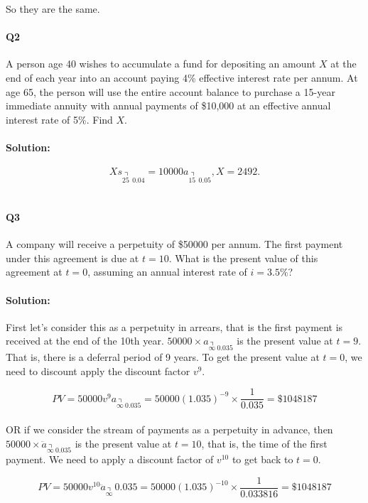 \documentclass[a4paper, 11pt, twoside]{article}
\begin{document}
So they are the same.\\

\paragraph{Q2} A person age 40 wishes to accumulate a fund for depositing an amount $X$ at the end of each year into an account paying 4\% effective interest rate per annum. At age 65, the person will use the entire account balance to purchase a 15-year immediate annuity with annual payments of \$10,000 at an effective annual interest rate of 5\%. Find $X$.\\

\paragraph{Solution:}

\[Xs_{\annuity{25\ \ }0.04} = 10000a_{\annuity{15\ \ }0.05}, X = 2492.\]\\

\paragraph{Q3} A company will receive a perpetuity of \$50000 per annum. The first payment under this agreement is due at $t=10$. What is the present value of this agreement at $t=0$, assuming an annual interest rate of $i=3.5\%$?\\

\paragraph{Solution:} First let's consider this as a perpetuity in arrears, that is the first payment is received at the end of the 10th year. $50000\times a_{\annuity{\infty\ }0.035}$ is the present value at $t=9$. That is, there is a deferral period of 9 years. To get the present value at $t=0$, we need to discount apply the discount factor $v^9$.

\[PV = 50000v^9a_{\annuity{\infty\ }0.035}=50000(1.035)^{-9}\times\frac{1}{0.035}=\$1048187\]\\

OR if we consider the stream of payments as a perpetuity in advance, then $50000\times\ddot{a}_{\annuity{\infty \ }0.035}$ is the present value at $t=10$, that is, the time of the first payment. We need to apply a discount factor of $v^{10}$ to get back to $t=0.$

\[PV=50000v^{10}\ddot{a}_{\annuity{\infty \ }}0.035 = 50000(1.035)^{-10}\times \frac{1}{0.033816}=\$1048187\]
\end{document}
